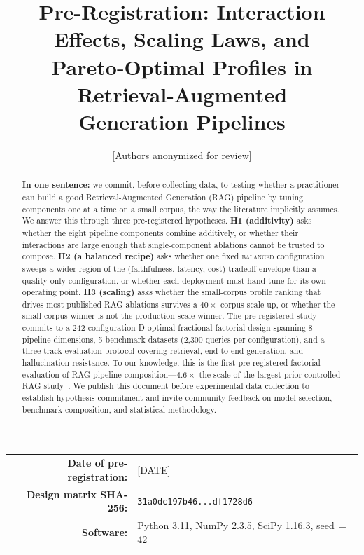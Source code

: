 \documentclass[11pt]{article}
\title{%
  \textbf{Pre-Registration:} Interaction Effects, Scaling Laws, and\\
  Pareto-Optimal Profiles in Retrieval-Augmented\\
  Generation Pipelines%
}
\author{%
  [Authors anonymized for review]%
}
\date{}
\begin{document}
\maketitle
\thispagestyle{empty}

\vspace{-1.5em}
\begin{center}
\begin{tabular}{@{}rl@{}}
  \textbf{Date of pre-registration:} & [DATE] \\
  \textbf{Design matrix SHA-256:}    & \texttt{31a0dc197b46...df1728d6} \\
  \textbf{Software:}                 & Python 3.11, NumPy 2.3.5, SciPy 1.16.3, seed\,$=$\,42 \\
\end{tabular}
\end{center}


\begin{abstract}
\noindent
\textbf{In one sentence:} we commit, before collecting data, to
testing whether a practitioner can build a good Retrieval-Augmented
Generation (RAG) pipeline by tuning components one at a time on a
small corpus, the way the literature implicitly assumes.
We answer this through three pre-registered hypotheses.
\textbf{H1 (additivity)} asks whether the eight pipeline components
combine additively, or whether their interactions are large enough
that single-component ablations cannot be trusted to compose.
\textbf{H2 (a balanced recipe)} asks whether one fixed
\textsc{balanced} configuration sweeps a wider region of the
(faithfulness, latency, cost) tradeoff envelope than a
quality-only configuration, or whether each deployment must
hand-tune for its own operating point.
\textbf{H3 (scaling)} asks whether the small-corpus profile ranking
that drives most published RAG ablations survives a $40\times$
corpus scale-up, or whether the small-corpus winner is not the
production-scale winner.
The pre-registered study commits to a 242-configuration D-optimal
fractional factorial design spanning 8 pipeline dimensions, 5
benchmark datasets (2{,}300 queries per configuration), and a
three-track evaluation protocol covering retrieval, end-to-end
generation, and hallucination resistance.  To our knowledge, this is
the first pre-registered factorial evaluation of RAG pipeline
composition---$4.6\times$ the scale of the largest prior controlled
RAG study~\citep{jin2024flashrag}.  We publish this document before
experimental data collection to establish hypothesis commitment and
invite community feedback on model selection, benchmark composition,
and statistical methodology.
\end{abstract}
\end{document}
